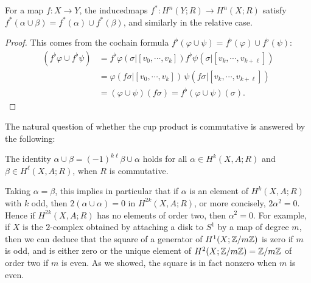 \begin{proposition}
For a map $f:X\to Y$, the inducedmaps $f^*:H^n(Y;R)\to H^n(X;R)$ satisfy $f^*(\alpha\cup\beta)=f^*(\alpha)\cup f^*(\beta)$, and similarly in the relative case.
\end{proposition}
\begin{proof}
This comes from the cochain formula $f^\flat(\varphi\cup\psi)=f^\flat(\varphi)\cup f^\flat(\psi)$:
\begin{align*}
(f^\flat\varphi\cup f^\flat\psi)&=f^\flat\varphi(\sigma|[v_0,\cdots,v_k])f^\flat\psi(\sigma|[v_k,\cdots,v_{k+\ell}])\\
&=\varphi(f\sigma|[v_0,\cdots,v_k])\,\psi(f\sigma|[v_k,\cdots,v_{k+\ell}])\\
&=(\varphi\cup\psi)(f\sigma)=f^\flat(\varphi\cup\psi)(\sigma).
\end{align*}
\end{proof}
The natural question of whether the cup product is commutative is answered by
the following:
\begin{theorem}
The identity $\alpha\cup\beta=(-1)^{k\ell}\beta\cup\alpha$ holds for all $\alpha\in H^k(X,A;R)$ and $\beta\in H^\ell(X,A;R)$, when $R$ is commutative.
\end{theorem}
Taking $\alpha=\beta$, this implies in particular that if $\alpha$ is an element of $H^k(X,A;R)$ with $k$ odd, then $2(\alpha\cup\alpha)=0$ in $H^{2k}(X,A;R)$, or more concisely, $2\alpha^2=0$. Hence if $H^{2k}(X,A;R)$ has no elements of order two, then $\alpha^2=0$. For example, if $X$ is the $2$-complex obtained by attaching a disk to $S^1$ by a map of degree $m$, then we can deduce that the square of a generator of $H^1(X;\mathbb{Z}/m\mathbb{Z})$ is zero if $m$
is odd, and is either zero or the unique element of $H^2(X;\mathbb{Z}/m\mathbb{Z})=\mathbb{Z}/m\mathbb{Z}$ of order two if $m$ is even. As we showed, the square is in fact nonzero when $m$ is even.
